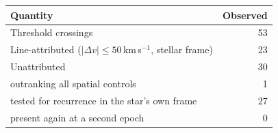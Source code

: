 \begin{tabular}{@{}lr@{}}
\hline
Quantity & Observed \\
\hline
Threshold crossings & 53 \\
Line-attributed ($|\Delta v|\leq50$\,km\,s$^{-1}$, stellar frame) & 23 \\
Unattributed & 30 \\
\quad outranking all spatial controls & 1 \\
\quad tested for recurrence in the star's own frame & 27 \\
\quad present again at a second epoch & 0 \\
\hline
\end{tabular}
